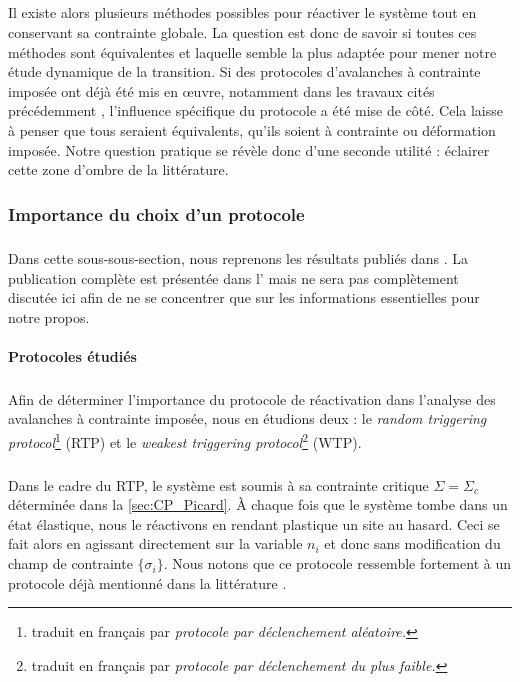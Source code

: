 \subparagraph{}Il existe alors plusieurs méthodes possibles pour réactiver le système tout en conservant sa contrainte globale. La question est donc de savoir si toutes ces méthodes sont équivalentes et laquelle semble la plus adaptée pour mener notre étude dynamique de la transition. Si des protocoles d'avalanches à contrainte imposée ont déjà été mis en œuvre, notamment dans les travaux cités précédemment \cite{budrikis_universal_2017, lin_scaling_2014}, l'influence spécifique du protocole a été mise de côté. Cela laisse à penser que tous seraient équivalents, qu'ils soient à contrainte ou déformation imposée. Notre question pratique se révèle donc d'une seconde utilité : éclairer cette zone d'ombre de la littérature.

\subsubsection{Importance du choix d'un protocole}

\label{sec:imp_prot}

\subparagraph{}Dans cette sous-sous-section, nous reprenons les résultats publiés dans \cite{jocteur_protocol_2025}. La publication complète est présentée dans l' mais ne sera pas complètement discutée ici afin de ne se concentrer que sur les informations essentielles pour notre propos.

\paragraph{Protocoles étudiés}

\subparagraph{}Afin de déterminer l'importance du protocole de réactivation dans l'analyse des avalanches à contrainte imposée, nous en étudions deux : le \textit{random triggering protocol}\footnote{traduit en français par \textit{protocole par déclenchement aléatoire.}} (RTP) et le \textit{weakest triggering protocol}\footnote{traduit en français par \textit{protocole par déclenchement du plus faible.}} (WTP).

\subparagraph{}Dans le cadre du RTP, le système est soumis à sa contrainte critique $\Sigma = \Sigma_c$ déterminée dans la \autoref{sec:CP_Picard}. \`A chaque fois que le système tombe dans un état élastique, nous le réactivons en rendant plastique un site au hasard. Ceci se fait alors en agissant directement sur la variable $n_i$ et donc sans modification du champ de contrainte $\{\sigma_i\}$. Nous notons que ce protocole ressemble fortement à un protocole déjà mentionné dans la littérature \cite{lin_scaling_2014}.

